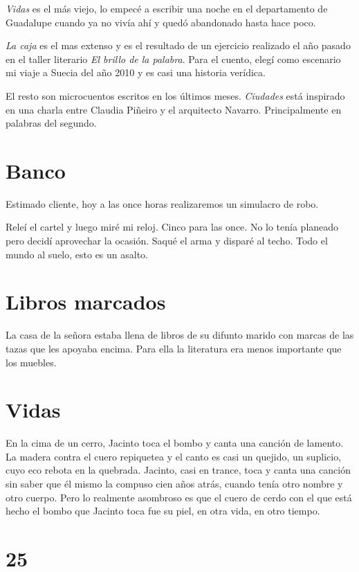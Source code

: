 \documentclass[11pt,twoside,openright,a6paper]{book}
\begin{document}
\emph{Vidas} es el más viejo, lo empecé a escribir una noche en el departamento de Guadalupe cuando ya no vivía ahí y quedó abandonado hasta hace poco.

\emph{La caja} es el mas extenso y es el resultado de un ejercicio realizado el año pasado en el taller literario \emph{El brillo de la palabra}. Para el cuento, elegí como escenario mi viaje a Suecia del año 2010 y es casi una historia verídica.

El resto son microcuentos escritos en los últimos meses. \emph{Ciudades} está inspirado en una charla entre Claudia Piñeiro y el arquitecto Navarro. Principalmente en palabras del segundo.

\chapter*{Banco}

Estimado cliente, hoy a las once horas realizaremos un simulacro de robo.

Releí el cartel y luego miré mi reloj. Cinco para las once. No lo tenía planeado pero decidí aprovechar la ocasión. Saqué el arma y disparé al techo. Todo el mundo al suelo, esto es un asalto.

\chapter*{Libros marcados}

La casa de la señora estaba llena de libros de su difunto marido con marcas de las tazas que les apoyaba encima. Para ella la literatura era menos importante que los muebles.

\chapter*{Vidas}

En la cima de un cerro, Jacinto toca el bombo y canta una canción de lamento. La madera contra el cuero repiquetea y el canto es casi un quejido, un suplicio, cuyo eco rebota en la quebrada. Jacinto, casi en trance, toca y canta una canción sin saber que él mismo la compuso cien años atrás, cuando tenía otro nombre y otro cuerpo. Pero lo realmente asombroso es que el cuero de cerdo con el que está hecho el bombo que Jacinto toca fue su piel, en otra vida, en otro tiempo.

\chapter*{25}
\end{document}
